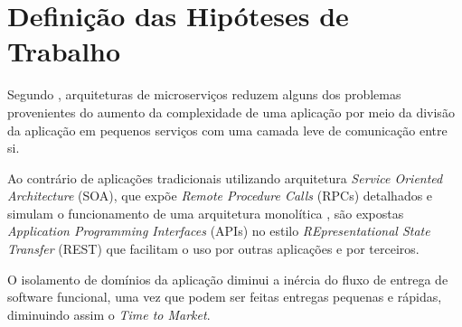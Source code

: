 \section{Definição das Hipóteses de Trabalho}

  Segundo , arquiteturas de microserviços reduzem
  alguns dos problemas provenientes do aumento da complexidade de uma aplicação
  por meio da divisão da aplicação em pequenos serviços com uma camada leve
  de comunicação entre si.

  Ao contrário de aplicações tradicionais utilizando arquitetura
  \textit{Service Oriented Architecture} (SOA), que expõe
  \textit{Remote Procedure Calls} (RPCs) detalhados e simulam o funcionamento
  de uma arquitetura monolítica \cite{Erl2008}, são expostas
  \textit{Application Programming Interfaces} (APIs) no estilo
  \textit{REpresentational State Transfer} (REST) que facilitam o uso por
  outras aplicações e por terceiros.

  O isolamento de domínios da aplicação diminui a inércia do fluxo de entrega
  de software funcional, uma vez que podem ser feitas entregas pequenas e
  rápidas, diminuindo assim o \textit{Time to Market}.
